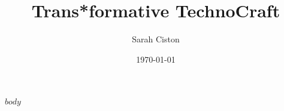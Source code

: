 \documentclass[11pt,oneside]{report}
\title{Trans*formative TechnoCraft}
\author{Sarah Ciston}
\date{\today}
\begin{document}
\maketitle
\renewcommand{\contentsname}{Table of Contents}
\tableofcontents
\listoffigures

\newpage


$body$
\end{document}
